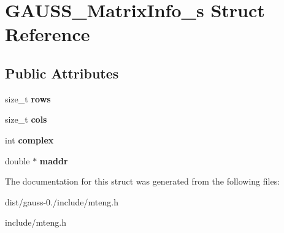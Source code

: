 \hypertarget{struct_g_a_u_s_s___matrix_info__s}{\section{G\-A\-U\-S\-S\-\_\-\-Matrix\-Info\-\_\-s Struct Reference}
\label{struct_g_a_u_s_s___matrix_info__s}
}
\subsection*{Public Attributes}
\begin{DoxyCompactItemize}
\item 
\hypertarget{struct_g_a_u_s_s___matrix_info__s_ae0445ed1fad7f389bb6517d3af442603}{size\-\_\-t {\bfseries rows}}\label{struct_g_a_u_s_s___matrix_info__s_ae0445ed1fad7f389bb6517d3af442603}

\item 
\hypertarget{struct_g_a_u_s_s___matrix_info__s_ae9b3ab2d4a63cad7a8cfd4d52a2ff64e}{size\-\_\-t {\bfseries cols}}\label{struct_g_a_u_s_s___matrix_info__s_ae9b3ab2d4a63cad7a8cfd4d52a2ff64e}

\item 
\hypertarget{struct_g_a_u_s_s___matrix_info__s_af6b3b0617735c0325cd35e2054218796}{int {\bfseries complex}}\label{struct_g_a_u_s_s___matrix_info__s_af6b3b0617735c0325cd35e2054218796}

\item 
\hypertarget{struct_g_a_u_s_s___matrix_info__s_a0ff8a359e545fe199c42afa8c24ed626}{double $\ast$ {\bfseries maddr}}\label{struct_g_a_u_s_s___matrix_info__s_a0ff8a359e545fe199c42afa8c24ed626}

\end{DoxyCompactItemize}


The documentation for this struct was generated from the following files\-:\begin{DoxyCompactItemize}
\item 
dist/gauss-\/0./include/mteng.\-h\item 
include/mteng.\-h\end{DoxyCompactItemize}
